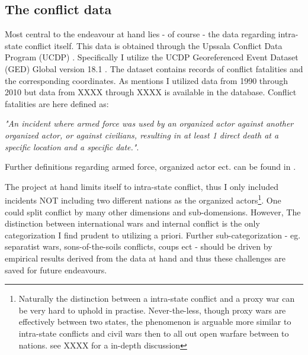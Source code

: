 \documentclass[a4paper]{article}
\begin{document}
\subsection{The conflict data}

Most central to the endeavour at hand lies - of course - the data regarding intra-state conflict itself. This data is obtained through the Upssala Conflict Data Program (UCDP) \citep{Sundberg_2013, Croicu_Sundberg_2017}. Specifically I utilize the UCDP Georeferenced Event Dataset (GED) Global version 18.1 \citep{UCDP_2017}. The dataset contains records of conflict fatalities and the corresponding coordinates. As mentions I utilized data from 1990 through 2010 but data from XXXX through XXXX is available in the database. Conflict fatalities are here defined as: 

\begin{displayquote}

\emph{"An incident where armed force was used by an organized actor against another organized actor, or against civilians, resulting in at least 1 direct death at a specific location and a specific date."}\citep[38]{Croicu_Sundberg_2017}.

\end{displayquote}

Further definitions regarding armed force, organized actor ect. can be found in \cite[10-11]{Croicu_Sundberg_2017}.\par 

The project at hand limits itself to intra-state conflict, thus I only included incidents NOT including two different nations as the organized actors\footnote{ Naturally the distinction between a intra-state conflict and a proxy war can be very hard to uphold in practise. Never-the-less, though proxy wars are effectively between two states, the phenomenon is arguable more similar to intra-state conflicts and civil wars then to all out open warfare between to nations. see XXXX for a in-depth discussion}. One could split conflict by many other dimensions and sub-domensions. However, The distinction between international wars and internal conflict is the only categorization I find prudent to utilizing a priori. Further sub-categorization - eg. separatist wars, sons-of-the-soils conflicts, coups ect - should be driven by empirical results derived from the data at hand and thus these challenges are saved for future endeavours.\par 
\end{document}
